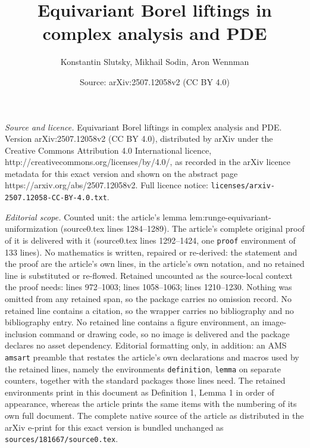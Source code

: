 \documentclass[10pt,a4paper]{amsart}
\title{\vspace{-2.2cm} Equivariant Borel liftings in complex analysis and PDE}
\author{Konstantin Slutsky, Mikhail Sodin, Aron Wennman}
\date{Source: arXiv:2507.12058v2 (CC BY 4.0)}
\begin{document}
\maketitle

\noindent\emph{Source and licence.} \vspace{-2.2cm} Equivariant Borel liftings in complex analysis and PDE. Version arXiv:2507.12058v2 (CC BY 4.0), distributed by arXiv under the Creative Commons Attribution 4.0 International licence, http://creativecommons.org/licenses/by/4.0/, as recorded in the arXiv licence metadata for this exact version and shown on the abstract page https://arxiv.org/abs/2507.12058v2. Full licence notice: \texttt{licenses/arxiv-2507.12058-CC-BY-4.0.txt}.\par\smallskip

\noindent\textit{Editorial scope.} Counted unit: the article's lemma lem:runge-equivariant-uniformization (source0.tex lines 1284--1289). The article's complete original proof of it is delivered with it (source0.tex lines 1292--1424, one \texttt{proof} environment of 133 lines). No mathematics is written, repaired or re-derived: the statement and the proof are the article's own lines, in the article's own notation, and no retained line is substituted or re-flowed.  Retained uncounted as the source-local context the proof needs: lines 972--1003; lines 1058--1063; lines 1210--1230.  Nothing was omitted from any retained span, so the package carries no omission record.  No retained line contains a citation, so the wrapper carries no bibliography and no bibliography entry.  No retained line contains a figure environment, an image-inclusion command or drawing code, so no image is delivered and the package declares no asset dependency.  Editorial formatting only, in addition: an AMS \texttt{amsart} preamble that restates the article's own declarations and macros used by the retained lines, namely the environments \texttt{definition}, \texttt{lemma} on separate counters, together with the standard packages those lines need.  The retained environments print in this document as Definition 1, Lemma 1 in order of appearance, whereas the article prints the same items with the numbering of its own full document.  The complete native source of the article as distributed in the arXiv e-print for this exact version is bundled unchanged as \texttt{sources/181667/source0.tex}.
\end{document}
